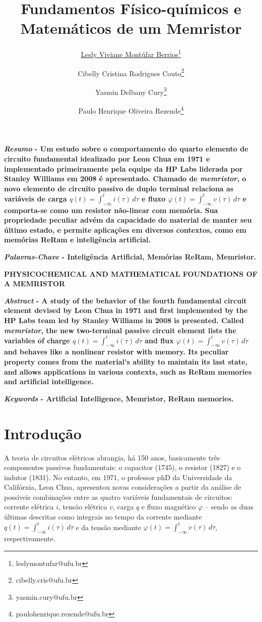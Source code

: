 \documentclass{ceel}
\title{Fundamentos Físico-químicos e Matemáticos de um Memristor}
\author[1]{\underline{Lesly Viviane Montúfar Berrios}\thanks{leslymontufar@ufu.br}}
\author[1]{Cibelly Cristina Rodrigues Couto\thanks{cibelly.cris@ufu.br}}
\author[1]{Yasmin Delbany Cury\thanks{yasmin.cury@ufu.br}}
\author[2]{Paulo Henrique Oliveira Rezende\thanks{paulohenrique.rezende@ufu.br}}
\affil[1]{FEELT - Universidade Federal de Uberlândia}
\affil[2]{FEELT - Professor Adjunto - Universidade Federal de Uberlândia}
\begin{document}
\inserirtitulo

\begin{multicols}{2}

\textbf{\emph{Resumo} - Um estudo sobre o comportamento do quarto elemento de circuito fundamental idealizado por Leon Chua em 1971 e implementado primeiramente pela equipe da HP Labs liderada por Stanley Williams em 2008 é apresentado. Chamado de \emph{memristor}, o novo elemento de circuito passivo de duplo terminal relaciona as variáveis de carga $q(t)=\int_{-\infty}^t i(\tau)\, d\tau$ e fluxo $\varphi(t)=\int_{-\infty}^t v(\tau)\, d\tau$ e comporta-se como um resistor não-linear com memória. Sua propriedade peculiar advém da capacidade do material de manter seu último estado, e permite aplicações em diversos contextos, como em memórias ReRam e inteligência artificial.} %
\vspace*{10pt}

\textbf{\emph{Palavras-Chave} - Inteligência Artificial, Memórias ReRam, Memristor.}


\begin{center}

\noindent\textbf{\large \uppercase{Physicochemical and Mathematical Foundations of a Memristor}}
\end{center}

\textbf{\emph{Abstract} - A study of the behavior of the fourth fundamental circuit element devised by Leon Chua in 1971 and first implemented by the HP Labs team led by Stanley Williams in 2008 is presented. Called \emph {memristor}, the new two-terminal passive circuit element lists the variables of charge $q(t)=\int_{-\infty}^t i(\tau)\, d\tau$ and flux $\varphi(t)=\int_{-\infty}^t v(\tau)\, d\tau$ and behaves like a nonlinear resistor with memory. Its peculiar property comes from the material's ability to maintain its last state, and allows applications in various contexts, such as ReRam memories and artificial intelligence.}
\vspace*{10pt}

\textbf{\emph{Keywords} - Artificial Intelligence, Memristor, ReRam memories.}


\section{Introdução}
A teoria de circuitos elétricos abrangia, há 150 anos, basicamente três componentes passivos fundamentais: o capacitor (1745), o resistor (1827) e o indutor (1831). No entanto, em 1971, o professor phD da Universidade da Califórnia, Leon Chua, apresentou novas considerações a partir da análise de possíveis combinações entre as quatro variáveis fundamentais de circuitos: corrente elétrica $i$, tensão elétrica $v$, carga $q$ e fluxo magnético $\varphi$ – sendo as duas últimas descritas como integrais no tempo da corrente mediante $q(t)=\int_{-\infty}^t i(\tau)\, d\tau$ e da tensão mediante $\varphi(t)=\int_{-\infty}^t v(\tau)\, d\tau$, respectivamente.


\end{multicols}
\end{document}
